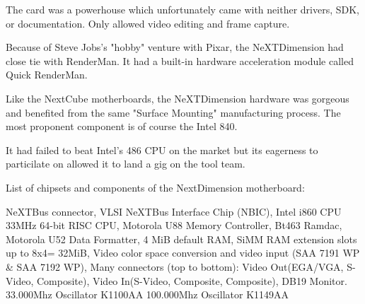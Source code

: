 \par
The card was a powerhouse which unfortunately came with neither drivers, SDK, or documentation. Only  allowed video editing and frame capture.\\
\par
{}
\par
Because of Steve Jobs's "hobby" venture with Pixar, the NeXTDimension had close tie with RenderMan. It had a built-in hardware acceleration module called Quick RenderMan.\\
\par
\par






\par
Like the NextCube motherboards, the NeXTDimension hardware was gorgeous and benefited from the same "Surface Mounting" manufacturing process. The most proponent component is of course the Intel 840.\\
\par It had failed to beat Intel's 486 CPU on the market but its eagerness to particilate on \doom allowed it to land a gig on the tool team.\\
\par
{}
\par
List of chipsets and components of the NextDimension motherboard:\\
\par 
{} NeXTBus connector,
 VLSI NeXTBus Interface Chip (NBIC),
 Intel i860 CPU 33MHz 64-bit RISC CPU,
 Motorola U88 Memory Controller,
 Bt463 Ramdac,
 Motorola U52 Data Formatter,
 4 MiB default RAM,
 SiMM RAM extension slots up to 8x4= 32MiB,
 Video color space conversion and video input (SAA 7191 WP \& SAA 7192 WP), 
 Many connectors (top to bottom): Video Out(EGA/VGA, S-Video, Composite), Video In(S-Video, Composite, Composite), DB19 Monitor.
 33.000Mhz Oscillator K1100AA
 100.000Mhz Oscillator K1149AA
\par


